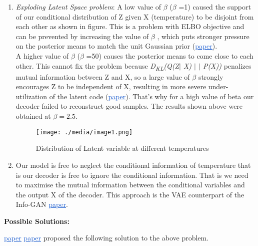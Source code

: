\documentclass[12pt,a4paper]{article}
\begin{document}
\begin{enumerate}
	\item \textit{Exploding Latent Space problem}: A low value of $ \beta $  ($ \beta $ =1) caused the support of our conditional distribution of Z given X (temperature) to be disjoint from each other as shown in figure. This is a problem with ELBO objective and can be prevented by increasing the value of $ \beta $ , which puts stronger pressure on the posterior means to match the unit Gaussian prior (\href{https://arxiv.org/pdf/1804.03599.pdf}{\textcolor[HTML]{1155CC}{\uline{paper}}}).\\
A higher value of $ \beta $  ($ \beta $ =50) causes the posterior means to come close to each other. This cannot fix the problem because \textit{D\textsubscript{KL}(Q(Z$ \vert $ X) $ \vert $ $ \vert $  P(X))} penalizes mutual information between Z and X, so a large value of $ \beta $  strongly encourages Z to be independent of X, resulting in more severe under-utilization of the latent code (\href{https://arxiv.org/pdf/1706.02262v2.pdf}{\textcolor[HTML]{1155CC}{\uline{paper}}}). That’s why for a high value of beta our decoder failed to reconstruct good samples. The results shown above were obtained at $\beta = 2.5$.\par

\begin{figure}[h!]
	\begin{Center}
		\texttt{[image: ./media/image1.png]}
		\caption{Distribution of Latent variable at different temperatures}
	\end{Center}
\end{figure}
\item Our model is free to neglect the conditional information of temperature that is our decoder is free to ignore the conditional information. That is we need to maximise the mutual information between the conditional variables and the output X of the decoder. This approach is the VAE counterpart of the Info-GAN \href{https://arxiv.org/pdf/1606.03657.pdf}{\textcolor[HTML]{1155CC}{\uline{paper}}}.
\end{enumerate}\par
\textbf{Possible Solutions:}\par
\href{https://arxiv.org/pdf/1706.02262v2.pdf}{\textcolor[HTML]{1155CC}{\uline{paper}}} \href{https://arxiv.org/pdf/1706.02262.pdf}{\textcolor[HTML]{1155CC}{\uline{paper}}} proposed the following solution to the above problem.\par
\end{document}
